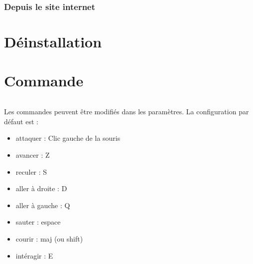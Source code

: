 \documentclass[titlepage, 13px, a4paper]{report}
\begin{document}
\section{Depuis le site internet}
\paragraph*{} \hspace{0pt}


\newpage


\part{Déinstallation} 



\newpage


\part{Commande} 
\paragraph*{} \hspace{0pt}
Les commandes peuvent être modifiés dans les paramètres. La configuration par défaut est : \\
{\begin{itemize}
	\item attaquer : Clic gauche de la souris
	\item avancer : Z
	\item reculer : S
	\item aller à droite : D
	\item aller à gauche : Q
	\item sauter : espace
	\item courir : maj (ou shift)
	\item intéragir :  E \\
\end{itemize}}


\newpage

\end{document}
